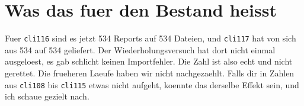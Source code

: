 \documentclass[11pt,a4paper]{article}
\newcommand{\code}[1]{\texttt{\small #1}}
\begin{document}
\section{Was das fuer den Bestand heisst}

Fuer \code{cli116} sind es jetzt 534 Reports auf 534 Dateien, und \code{cli117}
hat von sich aus 534 auf 534 geliefert. Der Wiederholungsversuch hat dort nicht
einmal ausgeloest, es gab schlicht keinen Importfehler. Die Zahl ist also echt und
nicht gerettet. Die frueheren Laeufe haben wir nicht nachgezaehlt. Falls dir in Zahlen aus
\code{cli108} bis \code{cli115} etwas nicht aufgeht, koennte das derselbe Effekt
sein, und ich schaue gezielt nach.
\end{document}
